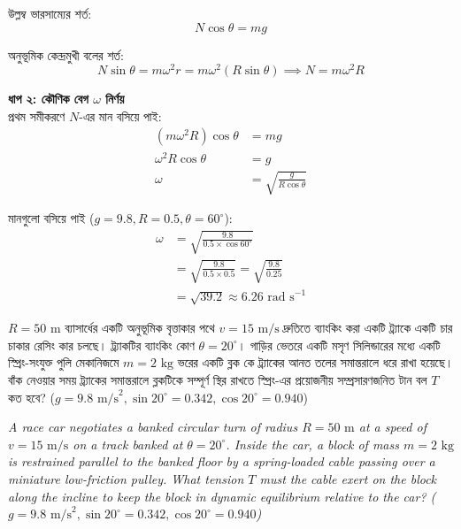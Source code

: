 \documentclass[12pt, a4paper]{article}
\begin{document}
{{\begin{tcolorbox}[solutionbox={সমাধান (Solution)}]
    উল্লম্ব ভারসাম্যের শর্ত:
    \[ N \cos\theta = mg \]
    
    অনুভূমিক কেন্দ্রমুখী বলের শর্ত:
    \[ N \sin\theta = m \omega^2 r = m \omega^2 (R \sin\theta) \implies N = m \omega^2 R \]
    
    \vspace{0.5em}
    \noindent\textbf{ধাপ ২: কৌণিক বেগ $\omega$ নির্ণয়} \\
    প্রথম সমীকরণে $N$-এর মান বসিয়ে পাই:
    \begin{align*}
        (m \omega^2 R) \cos\theta &= mg \\
        \omega^2 R \cos\theta &= g \\
        \omega &= \sqrt{\frac{g}{R \cos\theta}}
    \end{align*}
    
    মানগুলো বসিয়ে পাই ($g = 9.8, R = 0.5, \theta = 60^\circ$):
    \begin{align*}
        \omega &= \sqrt{\frac{9.8}{0.5 \times \cos 60^\circ}} \\
               &= \sqrt{\frac{9.8}{0.5 \times 0.5}} = \sqrt{\frac{9.8}{0.25}} \\
               &= \sqrt{39.2} \approx \mathbf{6.26}\text{ rad s}^{-1}
    \end{align*}
\end{tcolorbox}

\newpage

\begin{tcolorbox}[questionbox={প্রশ্ন (Question) 21}]
    \noindent
    $R = 50\text{ m}$ ব্যাসার্ধের একটি অনুভূমিক বৃত্তাকার পথে $v = 15\text{ m/s}$ দ্রুতিতে ব্যাংকিং করা একটি ট্র্যাকে একটি চার চাকার রেসিং কার চলছে। ট্র্যাকটির ব্যাংকিং কোণ $\theta = 20^\circ$। গাড়ির ভেতরে একটি মসৃণ সিলিন্ডারের মধ্যে একটি স্প্রিং-সংযুক্ত পুলি মেকানিজমে $m = 2\text{ kg}$ ভরের একটি ব্লক কে ট্র্যাকের আনত তলের সমান্তরালে ধরে রাখা হয়েছে। বাঁক নেওয়ার সময় ট্র্যাকের সমান্তরালে ব্লকটিকে সম্পূর্ণ স্থির রাখতে স্প্রিং-এর প্রয়োজনীয় সম্প্রসারণজনিত টান বল $T$ কত হবে? ($g = 9.8\text{ m/s}^2, \sin 20^\circ = 0.342, \cos 20^\circ = 0.940$)
    
    \vspace{0.8em}
    \begin{english}
    \noindent\textit{\color{darkgray}
    A race car negotiates a banked circular turn of radius $R = 50\text{ m}$ at a speed of $v = 15\text{ m/s}$ on a track banked at $\theta = 20^\circ$. Inside the car, a block of mass $m = 2\text{ kg}$ is restrained parallel to the banked floor by a spring-loaded cable passing over a miniature low-friction pulley. What tension $T$ must the cable exert on the block along the incline to keep the block in dynamic equilibrium relative to the car? ($g = 9.8\text{ m/s}^2, \sin 20^\circ = 0.342, \cos 20^\circ = 0.940$)
    }
    \end{english}
\end{tcolorbox}

}}
\end{document}
